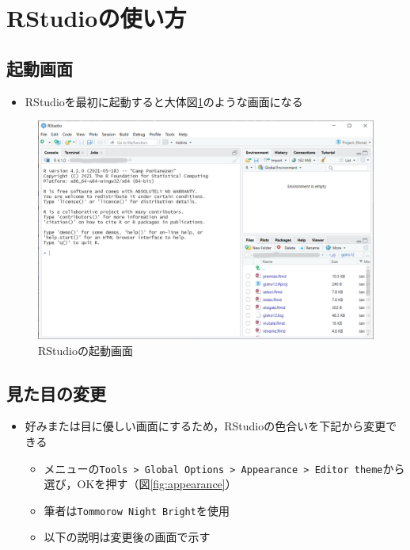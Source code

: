 \documentclass[
  xelatex,ja=standard, b5paper]{bxjsbook}
\providecommand{\tightlist}{%
  \setlength{\itemsep}{0pt}\setlength{\parskip}{0pt}}
\begin{document}
\hypertarget{p-howtouse-rst}{%
\section{RStudioの使い方}\label{p-howtouse-rst}}

\hypertarget{p-opening}{%
\subsection{起動画面}\label{p-opening}}

\begin{itemize}
\tightlist
\item
  RStudioを最初に起動すると大体図\ref{fig:start}のような画面になる
\end{itemize}

\begin{figure}

{\centering \includegraphics[width=0.8\linewidth]{images/start} 

}

\caption{RStudioの起動画面}\label{fig:start}
\end{figure}

\hypertarget{p-theme}{%
\subsection{見た目の変更}\label{p-theme}}

\begin{itemize}
\tightlist
\item
  好みまたは目に優しい画面にするため，RStudioの色合いを下記から変更できる

  \begin{itemize}
  \tightlist
  \item
    メニューの\texttt{Tools\ \textgreater{}\ Global\ Options\ \textgreater{}\ Appearance\ \textgreater{}\ Editor\ theme}から選び，OKを押す（図\ref{fig:appearance}）
  \item
    筆者は\texttt{Tommorow\ Night\ Bright}を使用
  \item
    以下の説明は変更後の画面で示す
  \end{itemize}
\end{itemize}
\end{document}

